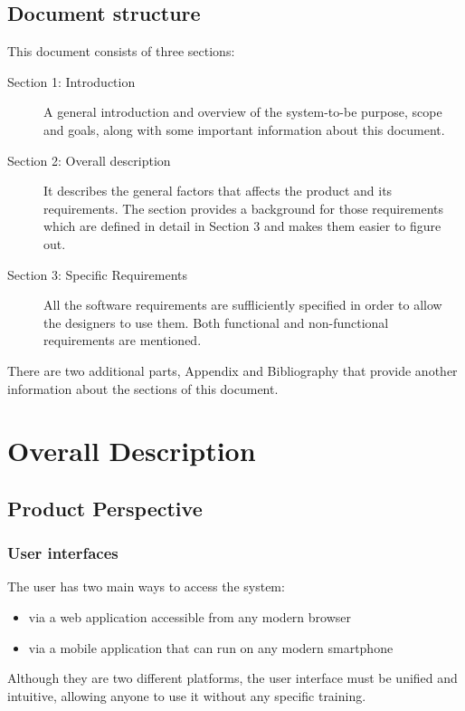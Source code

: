 \documentclass{article}
\begin{document}
	
	\subsection{Document structure}
	This document consists of three sections:

	\begin{description}
		\item[Section 1: Introduction] A general introduction and overview of the system-to-be purpose, scope and goals, along with some important information about this document.
		\item[Section 2: Overall description] It describes the general factors that affects the product and its requirements. The section provides a background for those requirements which are defined in detail in Section 3 and makes them easier to figure out.
		\item[Section 3: Specific Requirements] All the software requirements are suffliciently specified in order to allow the designers to use them. Both functional and non-functional requirements are mentioned.
	\end{description}
	
	\bigskip
	There are two additional parts, Appendix and Bibliography that provide another information about the sections of this document.
	
	\section{Overall Description}	
	
	
	\subsection{Product Perspective}
	
	
	\subsubsection{User interfaces}
	The user has two main ways to access the system:
	\begin{itemize}
		\item via a web application accessible from any modern browser
		\item via a mobile application that can run on any modern smartphone
	\end{itemize}
	Although they are two different platforms, the user interface must be unified and intuitive, allowing anyone to use it without any specific training.
\end{document}
